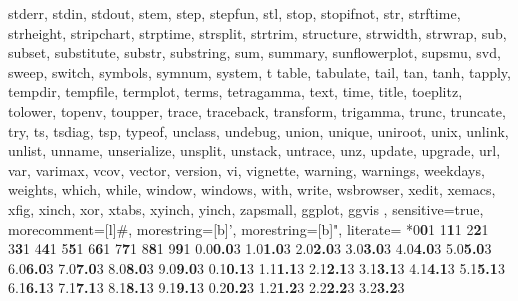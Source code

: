 {{        stderr, stdin, stdout, stem, step, stepfun, stl, stop, stopifnot, str, strftime, strheight, stripchart, strptime, strsplit, strtrim, structure, strwidth, strwrap,
        sub, subset, substitute, substr, substring, sum, summary, sunflowerplot, supsmu, svd, sweep, switch, symbols, symnum, system, t table, tabulate, tail, tan, tanh,
        tapply, tempdir, tempfile, termplot, terms, tetragamma, text, time, title, toeplitz, tolower, topenv, toupper, trace, traceback, transform, trigamma, trunc,
        truncate, try, ts, tsdiag, tsp, typeof, unclass, undebug, union, unique, uniroot, unix, unlink, unlist, unname, unserialize, unsplit, unstack, untrace, unz,
        update, upgrade, url, var, varimax, vcov, vector, version, vi, vignette, warning, warnings, weekdays, weights, which, while, window, windows, with, write,
        wsbrowser, xedit, xemacs, xfig, xinch, xor, xtabs, xyinch, yinch, zapsmall,
        ggplot, ggvis
    },
    sensitive=true,
    morecomment=[l]{\#},
    morestring=[b]',
    morestring=[b]",
    literate=%
    *{0}{{{\color{goldenrod2}\textbf{0}}}}1
    {1}{{{\color{goldenrod2}\textbf{1}}}}1
    {2}{{{\color{goldenrod2}\textbf{2}}}}1
    {3}{{{\color{goldenrod2}\textbf{3}}}}1
    {4}{{{\color{goldenrod2}\textbf{4}}}}1
    {5}{{{\color{goldenrod2}\textbf{5}}}}1
    {6}{{{\color{goldenrod2}\textbf{6}}}}1
    {7}{{{\color{goldenrod2}\textbf{7}}}}1
    {8}{{{\color{goldenrod2}\textbf{8}}}}1
    {9}{{{\color{goldenrod2}\textbf{9}}}}1
    {0.0}{{{\color{goldenrod2}\textbf{0.0}}}}3
    {1.0}{{{\color{goldenrod2}\textbf{1.0}}}}3
    {2.0}{{{\color{goldenrod2}\textbf{2.0}}}}3
    {3.0}{{{\color{goldenrod2}\textbf{3.0}}}}3
    {4.0}{{{\color{goldenrod2}\textbf{4.0}}}}3
    {5.0}{{{\color{goldenrod2}\textbf{5.0}}}}3
    {6.0}{{{\color{goldenrod2}\textbf{6.0}}}}3
    {7.0}{{{\color{goldenrod2}\textbf{7.0}}}}3
    {8.0}{{{\color{goldenrod2}\textbf{8.0}}}}3
    {9.0}{{{\color{goldenrod2}\textbf{9.0}}}}3
    {0.1}{{{\color{goldenrod2}\textbf{0.1}}}}3
    {1.1}{{{\color{goldenrod2}\textbf{1.1}}}}3
    {2.1}{{{\color{goldenrod2}\textbf{2.1}}}}3
    {3.1}{{{\color{goldenrod2}\textbf{3.1}}}}3
    {4.1}{{{\color{goldenrod2}\textbf{4.1}}}}3
    {5.1}{{{\color{goldenrod2}\textbf{5.1}}}}3
    {6.1}{{{\color{goldenrod2}\textbf{6.1}}}}3
    {7.1}{{{\color{goldenrod2}\textbf{7.1}}}}3
    {8.1}{{{\color{goldenrod2}\textbf{8.1}}}}3
    {9.1}{{{\color{goldenrod2}\textbf{9.1}}}}3
    {0.2}{{{\color{goldenrod2}\textbf{0.2}}}}3
    {1.2}{{{\color{goldenrod2}\textbf{1.2}}}}3
    {2.2}{{{\color{goldenrod2}\textbf{2.2}}}}3
    {3.2}{{{\color{goldenrod2}\textbf{3.2}}}}3
}

